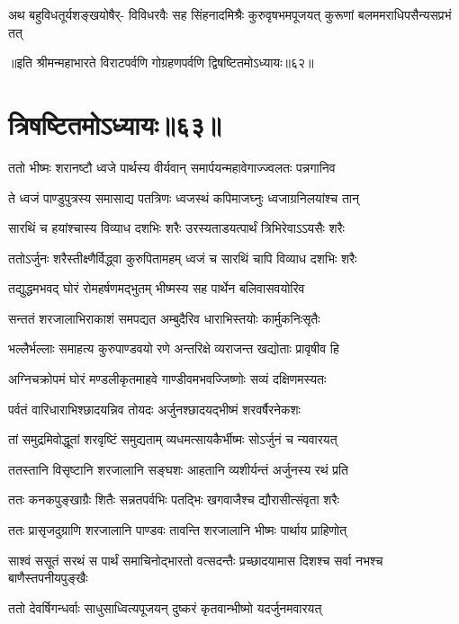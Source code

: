 \fourlineindentedshloka
{अथ बहुविधतूर्यशङ्खयोषैर्-}
{विविधरवैः सह सिंहनादमिश्रैः}
{कुरुवृषभमपूजयत् कुरूणां}
{बलममराधिपसैन्यसप्रभं तत्}

॥इति श्रीमन्महाभारते विराटपर्वणि गोग्रहणपर्वणि द्विषष्टितमोऽध्यायः॥६२॥

\chapter{त्रिषष्टितमोऽध्यायः॥६३॥}

\twolineshloka
{ततो भीष्मः शरानष्टौ ध्वजे पार्थस्य वीर्यवान्}
{समार्पयन्महावेगाज्ज्वलतः पन्नगानिव}


\twolineshloka
{ते ध्वजं पाण्डुपुत्रस्य समासाद्य पतत्रिणः}
{ध्वजस्थं कपिमाजघ्नुः ध्वजाग्रनिलयांश्च तान्}


\twolineshloka
{सारथिं च हयांश्चास्य विव्याध दशभिः शरैः}
{उरस्यताडयत्पार्थं त्रिभिरेवाऽऽयसैः शरैः}


\twolineshloka
{ततोऽर्जुनः शरैस्तीक्ष्णैर्विद्ध्वा कुरुपितामहम्}
{ध्वजं च सारथिं चापि विव्याध दशभिः शरैः}


\twolineshloka
{तद्युद्धमभवद् घोरं रोमहर्षणमद्भुतम्}
{भीष्मस्य सह पार्थेन बलिवासवयोरिव}


\twolineshloka
{सन्ततं शरजालाभिराकाशं समपद्यत}
{अम्बुदैरिव धाराभिस्तयोः कार्मुकनिःसृतैः}


\twolineshloka
{भल्लैर्भल्लाः समाहत्य कुरुपाण्डवयो रणे}
{अन्तरिक्षे व्यराजन्त खद्योताः प्रावृषीव हि}


\twolineshloka
{अग्निचक्रोपमं घोरं मण्डलीकृतमाहवे}
{गाण्डीवमभवज्जिष्णोः सव्यं दक्षिणमस्यतः}


\twolineshloka
{पर्वतं वारिधाराभिश्छादयन्निव तोयदः}
{अर्जुनश्छादयद्भीष्मं शरवर्षैरनेकशः}


\twolineshloka
{तां समुद्रमिवोद्धूतां शरवृष्टिं समुद्यताम्}
{व्यधमत्सायकैर्भीष्मः सोऽर्जुनं च न्यवारयत्}


\twolineshloka
{ततस्तानि विसृष्टानि शरजालानि सङ्घशः}
{आहतानि व्यशीर्यन्तं अर्जुनस्य रथं प्रति}


\twolineshloka
{ततः कनकपुङ्खाग्रैः शितैः सन्नतपर्वभिः}
{पतद्भिः खगवाजैश्च द्यौरासीत्संवृता शरैः}


\twolineshloka
{ततः प्रासृजदुग्राणि शरजालानि पाण्डवः}
{तावन्ति शरजालानि भीष्मः पार्थाय प्राहिणोत्}


\fourlineindentedshloka
{साश्वं ससूतं सरथं स पार्थं}
{समाचिनोद्भारतो वत्सदन्तैः}
{प्रच्छादयामास दिशश्च सर्वा}
{नभश्च बाणैस्तपनीयपुङ्खैः}


\twolineshloka
{ततो देवर्षिगन्धर्वाः साधुसाध्वित्यपूजयन्}
{दुष्करं कृतवान्भीष्मो यदर्जुनमवारयत्}


